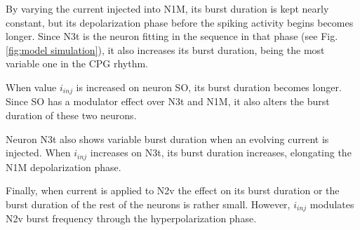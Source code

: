 
By varying the current injected into N1M, its burst duration is kept nearly constant, but its depolarization phase before the spiking activity begins becomes longer. Since N3t is the neuron fitting in the sequence in that phase (see Fig. \ref{fig:model simulation}), it also increases its burst duration, being the most variable one in the CPG rhythm. 

When %
value \(i_{inj}\) is increased on neuron SO, its burst duration becomes longer. Since SO has a modulator effect over N3t and N1M, it also alters the burst duration of these two neurons.

Neuron N3t also shows variable burst duration when an evolving current is injected. When \(i_{inj}\) increases on N3t, its burst duration increases, elongating the N1M depolarization phase.  

Finally, when current is applied to N2v the effect on its burst duration or the burst duration of the rest of the neurons is rather small. However, \(i_{inj}\) %
modulates N2v burst frequency through the hyperpolarization phase. 

